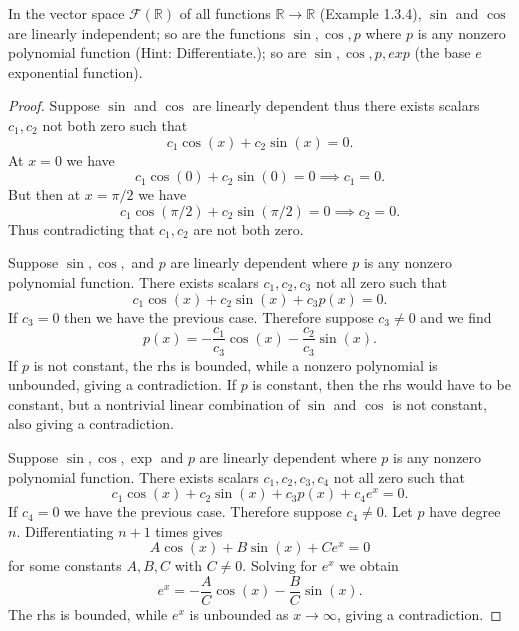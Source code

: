 \begin{tcolorbox}[title=Problem 9, breakable]
    In the vector space $\mathcal{F}(\mathbb{R})$ of all 
    functions $\mathbb{R} \longrightarrow \mathbb{R}$ (Example 1.3.4),
    $\sin$ and $\cos$ are linearly independent; so are the functions 
    $\sin, \cos, p$ where $p$ is any nonzero polynomial function 
    (Hint: Differentiate.); so are $\sin, \cos, p, exp$ (the base $e$ exponential function).
\end{tcolorbox}

\begin{proof}
    Suppose $\sin$ and $\cos$ are linearly dependent
    thus there exists scalars $c_1, c_2$ not both zero such that 
    \[
        c_1 \cos(x) + c_2 \sin(x) = 0.
    \]
    At $x = 0$ we have
    \[
        c_1 \cos(0) + c_2 \sin (0) = 0 \implies c_1 = 0.
    \]
    But then at $x = \pi / 2$ we have 
    \[
        c_1 \cos(\pi/2) + c_2 \sin (\pi/2) = 0 \implies c_2 = 0.
    \]
    Thus contradicting that $c_1, c_2$ are not both zero.

    Suppose $\sin, \cos,$ and $p$ are linearly dependent where $p$ is any nonzero polynomial function.
    There exists scalars $c_1, c_2, c_3$ not all zero such that 
    \[
        c_1 \cos(x) + c_2 \sin(x) + c_3 p(x) = 0.
    \]
    If $c_3 = 0$ then we have the previous case.
    Therefore suppose $c_3 \ne 0$ and we find 
    \[
        p(x) = -\frac{c_1}{c_3} \cos(x) - \frac{c_2}{c_3} \sin(x).
    \]
    If $p$ is not constant, the rhs is bounded, while a nonzero polynomial is unbounded, giving a contradiction.
    If $p$ is constant, then the rhs would have to be constant, but a nontrivial linear combination of $\sin$ and $\cos$ is not constant, also giving a contradiction.

    Suppose $\sin, \cos, \exp$ and $p$ are linearly dependent where $p$ is any nonzero polynomial function.
    There exists scalars $c_1, c_2, c_3, c_4$ not all zero such that 
    \[
        c_1 \cos(x) + c_2 \sin(x) + c_3 p(x) + c_4 e^x = 0.
    \]
    If $c_4 = 0$ we have the previous case.
    Therefore suppose $c_4 \ne 0$.
    Let $p$ have degree $n$. Differentiating $n+1$ times gives
    \[
        A \cos(x) + B \sin(x) + C e^x = 0
    \]
    for some constants $A,B,C$ with $C \ne 0$.
    Solving for $e^x$ we obtain
    \[
        e^x = -\frac{A}{C} \cos(x) - \frac{B}{C} \sin(x).
    \]
    The rhs is bounded, while $e^x$ is unbounded as $x \to \infty$,
        giving a contradiction.
\end{proof}


